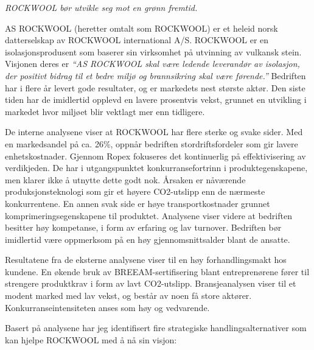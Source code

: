 \textit{ROCKWOOL bør utvikle seg mot en grønn fremtid.}

\indent \newline
AS ROCKWOOL (heretter omtalt som ROCKWOOL) er et heleid norsk datterselskap av ROCKWOOL international A/S. ROCKWOOL er en isolasjonsprodusent som baserer sin virksomhet på utvinning av vulkansk stein. Visjonen deres er \textit{\textquotedblleft AS ROCKWOOL skal være ledende leverandør av isolasjon, der positivt bidrag til et bedre miljø og brannsikring skal være førende.\textquotedblright} Bedriften har i flere år levert gode resultater, og er markedets nest største aktør. Den siste tiden har de imidlertid opplevd en lavere prosentvis vekst, grunnet en utvikling i markedet hvor miljøet blir vektlagt mer enn tidligere.

\indent \newline
De interne analysene viser at ROCKWOOL har flere sterke og svake sider. Med en markedsandel på ca. 26\%, oppnår bedriften stordriftsfordeler som gir lavere enhetskostnader. Gjennom Ropex fokuseres det kontinuerlig på effektivisering av verdikjeden. De har i utgangspunktet konkurransefortrinn i produktegenskapene, men klarer ikke å utnytte dette godt nok. Årsaken er nåværende produksjonsteknologi som gir et høyere CO2-utslipp enn de nærmeste konkurrentene. En annen svak side er høye transportkostnader grunnet komprimeringsegenskapene til produktet. Analysene viser videre at bedriften besitter høy kompetanse, i form av erfaring og lav turnover. Bedriften bør imidlertid være oppmerksom på en høy gjennomsnittsalder blant de ansatte. 

\indent \newline
Resultatene fra de eksterne analysene viser til en høy forhandlingsmakt hos kundene. En økende bruk av BREEAM-sertifisering blant entreprenørene fører til strengere produktkrav i form av lavt CO2-utslipp. Bransjeanalysen viser til et modent marked med lav vekst, og består av noen få store aktører. Konkurranseintensiteten anses som høy og vedvarende. 

\indent \newline
Basert på analysene har jeg identifisert fire strategiske handlingsalternativer som kan hjelpe ROCKWOOL med å nå sin visjon:

